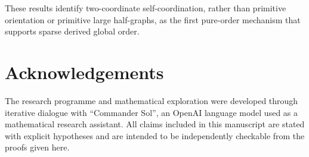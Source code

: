 \documentclass[11pt]{article}
\theoremstyle{definition}
\begin{document}
These results identify two-coordinate self-coordination, rather than primitive orientation or primitive large half-graphs, as the first pure-order mechanism that supports sparse derived global order.

\section*{Acknowledgements}
The research programme and mathematical exploration were developed through iterative dialogue with ``Commander Sol'', an OpenAI language model used as a mathematical research assistant.  All claims included in this manuscript are stated with explicit hypotheses and are intended to be independently checkable from the proofs given here.



\end{document}
